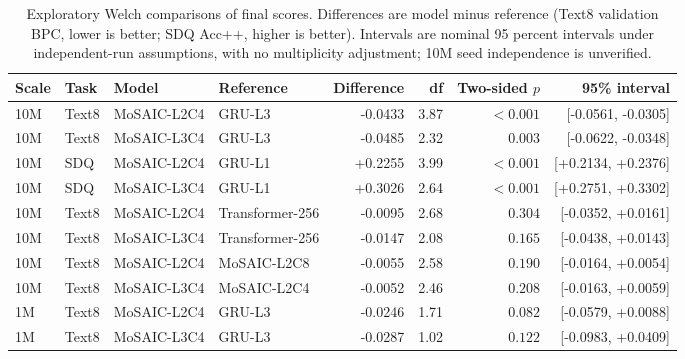 \begin{table}[H]
\centering
\small
\caption{Exploratory Welch comparisons of final scores. Differences are model minus reference (Text8 validation BPC, lower is better; SDQ Acc++, higher is better). Intervals are nominal 95 percent intervals under independent-run assumptions, with no multiplicity adjustment; 10M seed independence is unverified.}
\label{tab:welch}
\begin{tabular}{llllrrrr}
\toprule
Scale & Task & Model & Reference & Difference & df & Two-sided $p$ & 95\% interval \\
\midrule
10M & Text8 & MoSAIC-L2C4 & GRU-L3 & -0.0433 & 3.87 & $<0.001$ & [-0.0561, -0.0305] \\
10M & Text8 & MoSAIC-L3C4 & GRU-L3 & -0.0485 & 2.32 & $0.003$ & [-0.0622, -0.0348] \\
10M & SDQ & MoSAIC-L2C4 & GRU-L1 & +0.2255 & 3.99 & $<0.001$ & [+0.2134, +0.2376] \\
10M & SDQ & MoSAIC-L3C4 & GRU-L1 & +0.3026 & 2.64 & $<0.001$ & [+0.2751, +0.3302] \\
\midrule
10M & Text8 & MoSAIC-L2C4 & Transformer-256 & -0.0095 & 2.68 & $0.304$ & [-0.0352, +0.0161] \\
10M & Text8 & MoSAIC-L3C4 & Transformer-256 & -0.0147 & 2.08 & $0.165$ & [-0.0438, +0.0143] \\
10M & Text8 & MoSAIC-L2C4 & MoSAIC-L2C8 & -0.0055 & 2.58 & $0.190$ & [-0.0164, +0.0054] \\
10M & Text8 & MoSAIC-L3C4 & MoSAIC-L2C4 & -0.0052 & 2.46 & $0.208$ & [-0.0163, +0.0059] \\
\midrule
1M & Text8 & MoSAIC-L2C4 & GRU-L3 & -0.0246 & 1.71 & $0.082$ & [-0.0579, +0.0088] \\
1M & Text8 & MoSAIC-L3C4 & GRU-L3 & -0.0287 & 1.02 & $0.122$ & [-0.0983, +0.0409] \\
\bottomrule
\end{tabular}
\end{table}
